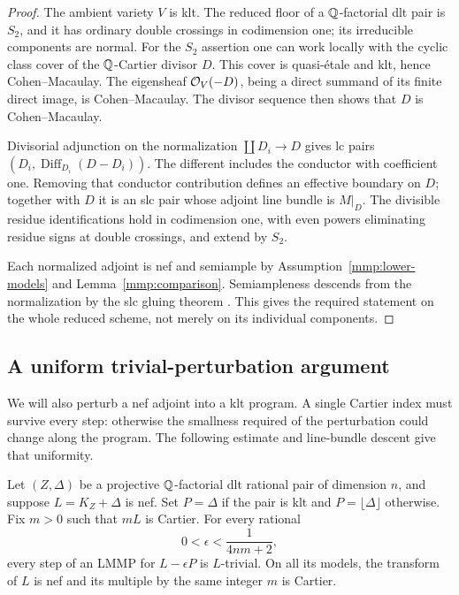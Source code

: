 \begin{proof}
The ambient variety \(V\) is klt. The reduced floor of a
\(\mathbb{Q}\)-factorial dlt pair is \(S_2\), and it has ordinary double
crossings in codimension one; its irreducible components are normal.
For the \(S_2\) assertion one can work locally with the cyclic
class cover of the \(\mathbb{Q}\)-Cartier divisor \(D\). This cover is
quasi-\'etale and klt, hence Cohen--Macaulay. The eigensheaf
\(\mathcal{O}_V(-D)\), being a direct summand of its finite direct image,
is Cohen--Macaulay. The divisor sequence then shows that \(D\)
is Cohen--Macaulay.

Divisorial adjunction on the normalization
\(\coprod D_i\to D\) gives lc pairs
\((D_i,\operatorname{Diff}_{D_i}(D-D_i))\).
The different includes the conductor with coefficient one.
Removing that conductor contribution defines an effective boundary
on \(D\); together with \(D\) it is an slc pair whose adjoint
line bundle is \(M|_D\). The divisible residue identifications
hold in codimension one, with even powers eliminating residue
signs at double crossings, and extend by \(S_2\).

Each normalized adjoint is nef and semiample by
Assumption~\ref{mmp:lower-models} and
Lemma~\ref{mmp:comparison}.
Semiampleness descends from the normalization by the slc gluing
theorem \cite[Theorem~1.5, equivalently Theorem~4.3]
{FujinoGongyo2014}. This gives the required statement on the
whole reduced scheme, not merely on its individual components.
\end{proof}

\subsection{A uniform trivial-perturbation argument}

We will also perturb a nef adjoint into a klt program. A single Cartier
index must survive every step: otherwise the smallness required of the
perturbation could change along the program. The following estimate and
line-bundle descent give that uniformity.

\begin{lemma}\label{mmp:trivial-perturbation}
Let \((Z,\Delta)\) be a projective \(\mathbb{Q}\)-factorial dlt rational
pair of dimension $n$, and suppose \(L=K_Z+\Delta\) is nef.
Set \(P=\Delta\) if the pair is klt and
\(P=\lfloor\Delta\rfloor\) otherwise.
Fix \(m>0\) such that \(mL\) is Cartier.
For every rational
\[
 0<\epsilon<\frac{1}{4nm+2},
\]
every step of an LMMP for \(L-\epsilon P\) is \(L\)-trivial.
On all its models, the transform of \(L\) is nef and its
multiple by the same integer \(m\) is Cartier.
\end{lemma}

